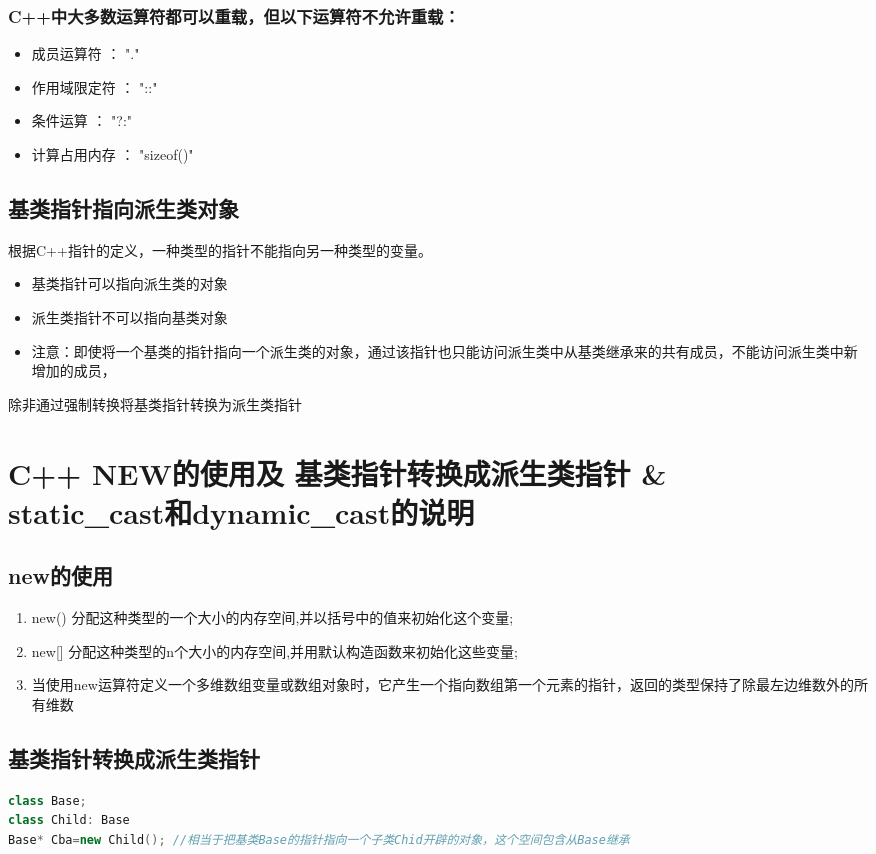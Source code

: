 \documentclass{article}
\begin{document}
\begin{CJK}{UTF8}{gbsn}
\subsubsection{C++中大多数运算符都可以重载，但以下运算符不允许重载：}
\begin{itemize}
\itemsep=-3pt
\item 成员运算符 ： "."
\item 作用域限定符 ： "::"
\item 条件运算 ： "?:"
\item 计算占用内存 ： "sizeof()"
\end{itemize}

\subsection{基类指针指向派生类对象}
根据C++指针的定义，一种类型的指针不能指向另一种类型的变量。
\begin{itemize}
\itemsep=-3pt
\item 基类指针可以指向派生类的对象
\item 派生类指针不可以指向基类对象
\item 注意：即使将一个基类的指针指向一个派生类的对象，通过该指针也只能访问派生类中从基类继承来的共有成员，不能访问派生类中新增加的成员，\
\end{itemize}
除非通过强制转换将基类指针转换为派生类指针

\section{C++ NEW的使用及 基类指针转换成派生类指针 \&\\
static\_cast和dynamic\_cast的说明}

\subsection{new的使用}
\begin{enumerate}
\itemsep=-3pt
\item new() 分配这种类型的一个大小的内存空间,并以括号中的值来初始化这个变量;
\item new[] 分配这种类型的n个大小的内存空间,并用默认构造函数来初始化这些变量; 
\item 当使用new运算符定义一个多维数组变量或数组对象时，它产生一个指向数组第一个元素的指针，返回的类型保持了除最左边维数外的所有维数
\end{enumerate}

\subsection{基类指针转换成派生类指针}
\begin{lstlisting}[language=c++]
class Base;
class Child: Base
Base* Cba=new Child(); //相当于把基类Base的指针指向一个子类Chid开辟的对象，这个空间包含从Base继承
\end{lstlisting}


\end{CJK}
\end{document}
